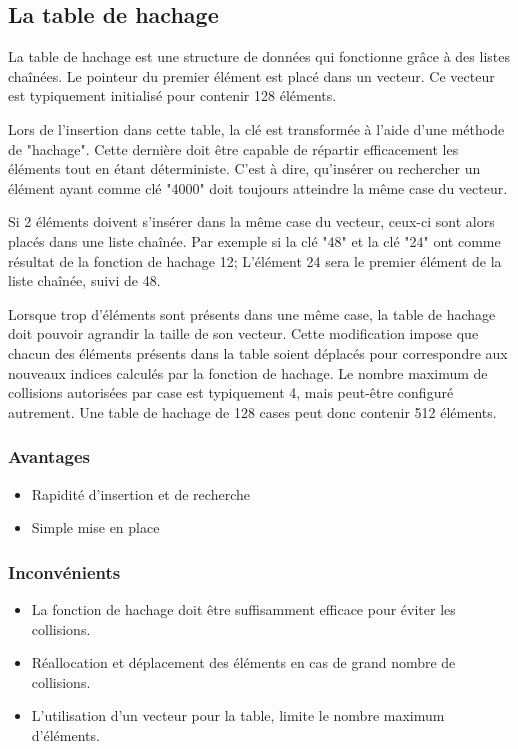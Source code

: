 \documentclass[hidelinks,a4paper, 12pt]{article}
\begin{document}
	\subsection{La table de hachage}
	La table de hachage est une structure de données qui fonctionne grâce à des listes chaînées. Le pointeur du premier élément est placé dans un vecteur. Ce vecteur est typiquement initialisé pour contenir 128 éléments. 
	
	Lors de l'insertion dans cette table, la clé est transformée à l'aide d'une méthode de "hachage". Cette dernière doit être capable de répartir efficacement les éléments tout en étant déterministe. C'est à dire, qu'insérer ou rechercher un élément ayant comme clé "4000" doit toujours atteindre la même case du vecteur. 
	
	Si 2 éléments doivent s'insérer dans la même case du vecteur, ceux-ci sont alors placés dans une liste chaînée. Par exemple si la clé "48" et la clé "24" ont comme résultat de la fonction de hachage 12; L'élément 24 sera le premier élément de la liste chaînée, suivi de 48.
	
	Lorsque trop d'éléments sont présents dans une même case, la table de hachage doit pouvoir agrandir la taille de son vecteur. Cette modification impose que chacun des éléments présents dans la table soient déplacés pour correspondre aux nouveaux indices calculés par la fonction de hachage. Le nombre maximum de collisions autorisées par case est typiquement 4, mais peut-être configuré autrement. Une table de hachage de 128 cases peut donc contenir 512 éléments. 
	
	
	
	
	\subsubsection*{Avantages}
	\begin{itemize}
		\item Rapidité d'insertion et de recherche
		\item Simple mise en place 
	\end{itemize}
	\subsubsection*{Inconvénients}
	\begin{itemize}
		\item La fonction de hachage doit être suffisamment efficace pour éviter les collisions.
		\item Réallocation et déplacement des éléments en cas de grand nombre de collisions.
		\item L'utilisation d'un vecteur pour la table, limite le nombre maximum d'éléments.
	\end{itemize}
\end{document}
